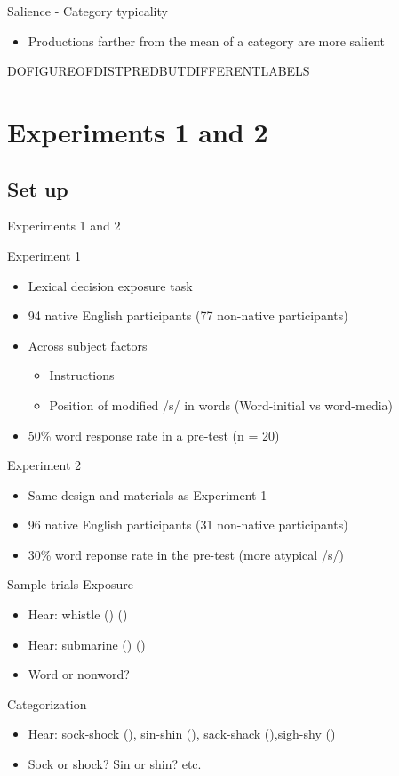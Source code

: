 \documentclass{beamer}
\begin{document}
\begin{frame}{Salience - Category typicality}

\begin{itemize}
\item Productions farther from the mean of a category are more salient
\end{itemize}

DOFIGUREOFDISTPREDBUTDIFFERENTLABELS
\end{frame}

\section{Experiments 1 and 2}

\subsection{Set up}

\begin{frame}{Experiments 1 and 2}

Experiment 1
\begin{itemize}
\item Lexical decision exposure task
\item 94 native English participants (77 non-native participants)
\item Across subject factors
\begin{itemize}
\item Instructions
\item Position of modified /s/ in words (Word-initial vs word-media)
\end{itemize}
\item 50\% word response rate in a pre-test (n = 20)
\end{itemize}
Experiment 2
\begin{itemize}
\item Same design and materials as Experiment 1
\item 96 native English participants (31 non-native participants)
\item 30\% word reponse rate in the pre-test (more atypical /s/)
\end{itemize}
\end{frame}

\begin{frame}{Sample trials}
Exposure
\begin{itemize}
\item Hear: whistle () ()
\item Hear: submarine () ()
\item Word or nonword?
\end{itemize}
Categorization
\begin{itemize}
\item Hear: sock-shock (), sin-shin (), sack-shack (),sigh-shy ()
\item Sock or shock? Sin or shin? etc.
\end{itemize}
\end{frame}
\end{document}
